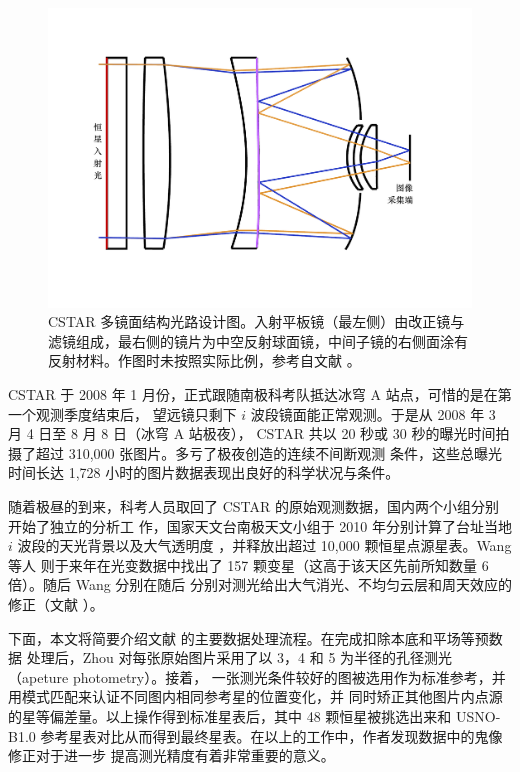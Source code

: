\begin{figure}[t]
\centering
\includegraphics[width=1.0\textwidth]{figures/chapter2/f2_cstaroptics.pdf}
\caption[CSTAR 多镜面结构光路设计图。入射平板镜（最左侧）由改正镜与滤镜组成，最右侧的镜片为中空反射球面镜，中间子镜的右侧面涂有反射材料，该图与实际大小不成比例。]{CSTAR 多镜面结构光路设计图。入射平板镜（最左侧）由改正镜与滤镜组成，最右侧的镜片为中空反射球面镜，中间子镜的右侧面涂有反射材料。作图时未按照实际比例，参考自文献 。}
\label{fig:cstaroptics}
\end{figure}

CSTAR 于 2008 年 1 月份，正式跟随南极科考队抵达冰穹 A 站点，可惜的是在第一个观测季度结束后，
望远镜只剩下 $i$ 波段镜面能正常观测。于是从 2008 年 3 月 4 日至 8 月 8 日（冰穹 A 站极夜），
CSTAR 共以 20 秒或 30 秒的曝光时间拍摄了超过 310,000 张图片。多亏了极夜创造的连续不间断观测
条件，这些总曝光时间长达 1,728 小时的图片数据表现出良好的科学状况与条件。

随着极昼的到来，科考人员取回了 CSTAR 的原始观测数据，国内两个小组分别开始了独立的分析工
作，国家天文台南极天文小组于 2010 年分别计算了台址当地 $i$ 波段的天光背景以及大气透明度
\cite{Zou2010}，并释放出超过 10,000 颗恒星点源星表\cite{ZhouX2010b}。Wang 等人\cite{Wang2011}
则于来年在光变数据中找出了 157 颗变星（这高于该天区先前所知数量 6 倍）。随后 Wang 分别在随后
分别对测光给出大气消光、不均匀云层和周天效应的修正（文献 ）。

下面，本文将简要介绍文献 \cite{ZhouX2010b} 的主要数据处理流程。在完成扣除本底和平场等预数据
处理后，Zhou 对每张原始图片采用了以 3，4 和 5 为半径的孔径测光（apeture photometry）。接着，
一张测光条件较好的图被选用作为标准参考，并用模式匹配来认证不同图内相同参考星的位置变化，并
同时矫正其他图片内点源的星等偏差量。以上操作得到标准星表后，其中 48 颗恒星被挑选出来和 
USNO-B1.0 参考星表对比从而得到最终星表。在以上的工作中，作者发现数据中的鬼像修正对于进一步
提高测光精度有着非常重要的意义。

